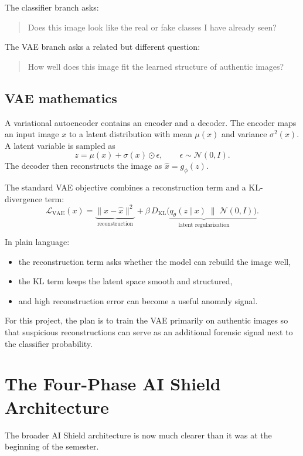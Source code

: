 \documentclass[11pt]{article}
\begin{document}
The classifier branch asks:
\begin{quote}
Does this image look like the real or fake classes I have already seen?
\end{quote}

The VAE branch asks a related but different question:
\begin{quote}
How well does this image fit the learned structure of authentic images?
\end{quote}

\subsection{VAE mathematics}

A variational autoencoder contains an encoder and a decoder. The encoder maps an input image \(x\) to a latent distribution with mean \(\mu(x)\) and variance \(\sigma^2(x)\). A latent variable is sampled as
\[
z = \mu(x) + \sigma(x)\odot\epsilon, \qquad \epsilon \sim \mathcal{N}(0,I).
\]
The decoder then reconstructs the image as \(\hat{x} = g_{\phi}(z)\).

The standard VAE objective combines a reconstruction term and a KL-divergence term:
\[
\mathcal{L}_{\text{VAE}}(x) = \underbrace{\|x-\hat{x}\|^2}_{\text{reconstruction}} + \beta\,\underbrace{D_{\mathrm{KL}}\big(q_{\theta}(z\mid x)\;\|\;\mathcal{N}(0,I)\big)}_{\text{latent regularization}}.
\]

In plain language:
\begin{itemize}[leftmargin=1.5em]
    \item the reconstruction term asks whether the model can rebuild the image well,
    \item the KL term keeps the latent space smooth and structured,
    \item and high reconstruction error can become a useful anomaly signal.
\end{itemize}

For this project, the plan is to train the VAE primarily on authentic images so that suspicious reconstructions can serve as an additional forensic signal next to the classifier probability.

\section{The Four-Phase AI Shield Architecture}

The broader AI Shield architecture is now much clearer than it was at the beginning of the semester.
\end{document}
